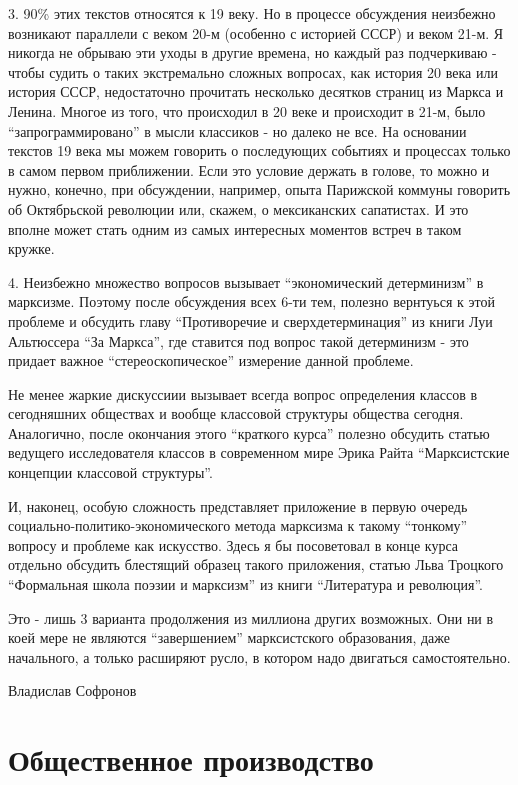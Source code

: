 \documentclass[12pt]{article}
\newcommand\resetparcount{%
  \setcounter{parcount}{0}
}
\newcounter{parcount}
\begin{document}
3. 90\% этих текстов относятся к 19 веку. Но в процессе обсуждения неизбежно возникают параллели с веком 20-м (особенно с историей СССР) и веком 21-м. Я никогда не обрываю эти уходы в другие времена, но каждый раз подчеркиваю - чтобы судить о таких экстремально сложных вопросах, как история 20 века или история СССР, недостаточно прочитать несколько десятков страниц из Маркса и Ленина. Многое из того, что происходил в 20 веке и происходит в 21-м, было “запрограммировано” в мысли классиков - но далеко не все. На основании текстов 19 века мы можем говорить о последующих событиях и процессах только в самом первом приближении. Если это условие держать в голове, то можно и нужно, конечно, при обсуждении, например, опыта Парижской коммуны говорить об Октябрьской революции или, скажем, о мексиканских сапатистах. И это вполне может стать одним из самых интересных моментов встреч в таком кружке.


4. Неизбежно множество вопросов вызывает “экономический детерминизм” в марксизме. Поэтому после обсуждения всех 6-ти тем, полезно вернтуься к этой проблеме и обсудить главу “Противоречие и сверхдетерминация” из книги Луи Альтюссера “За Маркса”, где ставится под вопрос такой детерминизм - это придает важное “стереоскопическое” измерение данной проблеме.


Не менее жаркие дискуссиии вызывает всегда вопрос определения классов в сегодняшних обществах и вообще классовой структуры общества сегодня. Аналогично, после окончания этого “краткого курса” полезно обсудить статью ведущего исследователя классов в современном мире Эрика Райта “Марксистские концепции классовой структуры”.


И, наконец, особую сложность представляет приложение в первую очередь социально-политико-экономического метода марксизма к такому “тонкому” вопросу и проблеме как искусство. Здесь я бы посоветовал в конце курса отдельно обсудить блестящий образец такого приложения, статью Льва Троцкого “Формальная школа поэзии и марксизм” из книги “Литература и революция”.


Это - лишь 3 варианта продолжения из миллиона других возможных. Они ни в коей мере не являются “завершением” марксистского образования, даже начального, а только расширяют русло, в котором надо двигаться самостоятельно.

Владислав Софронов





\section{Общественное производство}
\resetparcount
\end{document}
